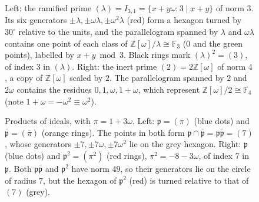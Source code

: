 \documentclass[11pt]{article}
\numberwithin{equation}{section}
\newcommand{\OO}{\mathbb Z[\omega]}
\newcommand{\F}{\mathbb F}
\theoremstyle{definition}
\theoremstyle{remark}
\begin{document}
\begin{figure}[ht]
\centering

\caption{Left: the ramified prime $(\lambda)=I_{3,1}=\{x+y\omega:3\mid x+y\}$ of norm $3$. Its six generators
$\pm\lambda,\pm\omega\lambda,\pm\omega^2\lambda$ (red) form a hexagon turned by $30^\circ$ relative to the units,
and the parallelogram spanned by $\lambda$ and $\omega\lambda$ contains one point of each class of
$\OO/\lambda\cong\F_3$ ($0$ and the green points), labelled by $x+y\bmod3$. Black rings mark $(\lambda)^2=(3)$, of index $3$ in $(\lambda)$.
Right: the inert prime $(2)=2\OO$ of norm $4$, a copy of $\OO$ scaled by $2$. The parallelogram spanned by $2$ and
$2\omega$ contains the residues $0,1,\omega,1+\omega$, which represent $\OO/2\cong\F_4$ (note $1+\omega=-\omega^2\equiv\omega^2$).}
\label{fig:ideal-ram-inert}
\end{figure}

\begin{figure}[ht]
\centering

\caption{Products of ideals, with $\pi=1+3\omega$. Left: $\mathfrak p=(\pi)$ (blue dots) and
$\bar{\mathfrak p}=(\bar\pi)$ (orange rings). The points in both form $\mathfrak p\cap\bar{\mathfrak p}=
\mathfrak p\bar{\mathfrak p}=(7)$, whose generators $\pm7,\pm7\omega,\pm7\omega^2$ lie on the grey hexagon.
Right: $\mathfrak p$ (blue dots) and $\mathfrak p^2=(\pi^2)$ (red rings), $\pi^2=-8-3\omega$, of index $7$ in
$\mathfrak p$. Both $\mathfrak p\bar{\mathfrak p}$ and $\mathfrak p^2$ have norm $49$, so their generators lie
on the circle of radius $7$, but the hexagon of $\mathfrak p^2$ (red) is turned relative to that of
$(7)$ (grey).}
\label{fig:ideal-products}
\end{figure}
\end{document}
